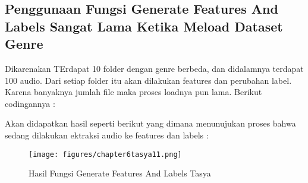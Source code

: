 \subsection{Penggunaan Fungsi Generate Features And Labels Sangat Lama Ketika Meload Dataset Genre}
\par Dikarenakan TErdapat 10 folder dengan genre berbeda, dan didalamnya terdapat 100 audio. Dari setiap folder itu akan dilakukan features dan perubahan label. Karena banyaknya jumlah file maka proses loadnya pun lama.
Berikut codingannya :

Akan didapatkan hasil seperti berikut yang dimana menunujukan proses bahwa sedang dilakukan ektraksi audio ke features dan labels :
\begin{figure}[ht]
\centering
\texttt{[image: figures/chapter6tasya11.png]}
\caption{Hasil Fungsi Generate Features And Labels Tasya}
\label{Praktek}
\end{figure}


